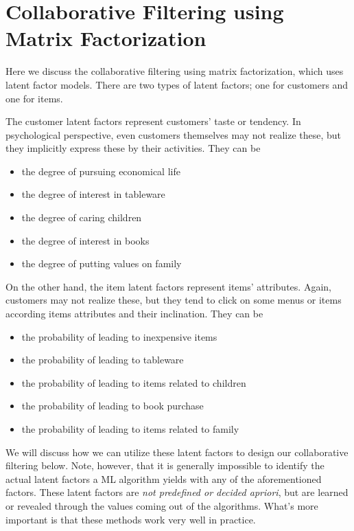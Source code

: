 \newpage
\section{Collaborative Filtering using Matrix Factorization}

Here we discuss the collaborative filtering using matrix factorization,
which uses latent factor models.
There are two types of latent factors; one for customers and one for items.

The customer latent factors represent customers' taste or tendency.
In psychological perspective, even customers themselves may not realize these,
but they implicitly express these by their activities.
They can be
\begin{itemize}
\item the degree of pursuing economical life
\item the degree of interest in tableware
\item the degree of caring children
\item the degree of interest in books
\item the degree of putting values on family
\end{itemize}

On the other hand, the item latent factors represent items' attributes.
Again, customers may not realize these, but they tend to click on some menus or items
according items attributes and their inclination.
They can be
\begin{itemize}
\item the probability of leading to inexpensive items
\item the probability of leading to tableware
\item the probability of leading to items related to children
\item the probability of leading to book purchase
\item the probability of leading to items related to family
\end{itemize}

We will discuss how we can utilize these latent factors to design our collaborative filtering below.
Note, however, that it is generally impossible to identify the actual latent factors
a ML algorithm yields with any of the aforementioned factors.
These latent factors are \emph{not predefined or decided apriori},
but are learned or revealed through the values coming out of the algorithms.
What's more important is that these methods work very well in practice.

